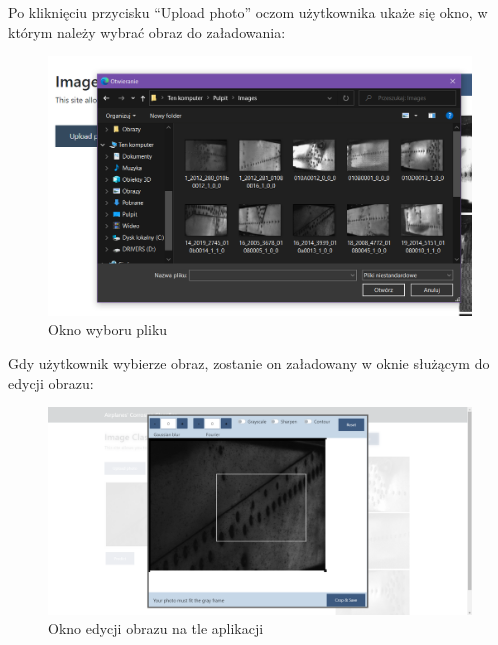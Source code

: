 \documentclass[polish,12pt]{aghthesis}
\begin{document}
\noindent Po kliknięciu przycisku ``Upload photo'' oczom użytkownika ukaże się okno, w którym należy wybrać obraz do załadowania:
\begin{figure}[H]%
\centering
\includegraphics[width=12cm]{images/oknoWyboruPliku.PNG}
\caption{Okno wyboru pliku}
\end{figure}

\noindent Gdy użytkownik wybierze obraz, zostanie on załadowany w oknie służącym do edycji obrazu:
\begin{figure}[H]%
\centering
\includegraphics[width=13.5cm]{images/oknoEdycjiObrazu.PNG}
\caption{Okno edycji obrazu na tle aplikacji}
\end{figure}
\end{document}
